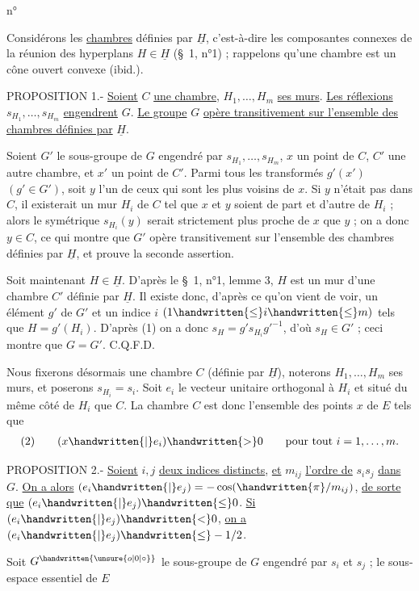 \begin{flushright}n°\end{flushright}
Considérons les \uline{chambres} définies par $\underline{H}$, c'est-à-dire les composantes connexes de la réunion des hyperplans $H\in\underline{H}$ (\S\ 1, n°1) ; rappelons qu'une chambre est un cône ouvert convexe (ibid.).

PROPOSITION 1.- \uline{Soient} $C$ \uline{une chambre}, $H_1,\ldots,H_m$ \uline{ses murs}. \uline{Les réflexions} $s_{H_1},\ldots,s_{H_m}$ \uline{engendrent} $G$. \uline{Le groupe} $G$ \uline{opère transitivement sur l'ensemble des chambres définies par} $\underline{H}$.

Soient $G'$ le sous-groupe de $G$ engendré par $s_{H_1},\ldots,s_{H_m}$, $x$ un point de $C$, $C'$ une autre chambre, et $x'$ un point de $C'$. Parmi tous les transformés $g'(x')$ $(g'\in G')$, soit $y$ l'un de ceux qui sont les plus voisins de $x$. Si $y$ n'était pas dans $C$, il existerait un mur $H_i$ de $C$ tel que $x$ et $y$ soient de part et d'autre de $H_i$ ; alors le symétrique $s_{H_i}(y)$ serait strictement plus proche de $x$ que $y$ ; on a donc $y\in C$, ce qui montre que $G'$ opère transitivement sur l'ensemble des chambres définies par $\underline{H}$, et prouve la seconde assertion.

Soit maintenant $H\in\underline{H}$. D'après le \S\ 1, n°1, lemme 3, $H$ est un mur d'une chambre $C'$ définie par $\underline{H}$. Il existe donc, d'après ce qu'on vient de voir, un élément $g'$ de $G'$ et un indice $i$ $(1\handwritten{\leq}i\handwritten{\leq}m)$ tels que $H=g'(H_i)$. D'après (1) on a donc $s_H=g's_{H_i}{g'}^{-1}$, d'où $s_H\in G'$ ; ceci montre que $G=G'$. C.Q.F.D.

Nous fixerons désormais une chambre $C$ (définie par $\underline{H}$), noterons $H_1,\ldots,H_m$ ses murs, et poserons $s_{H_i}=s_i$. Soit $e_i$ le vecteur unitaire orthogonal à $H_i$ et situé du même côté de $H_i$ que $C$. La chambre $C$ est donc l'ensemble des points $x$ de $E$ tels que
\[
\begin{array}{l@{\qquad}l}(2)&(x\handwritten{|}e_i)\handwritten{>}0\qquad\text{pour tout }i=1,\ldots,m.\end{array}
\]

PROPOSITION 2.- \uline{Soient} $i,j$ \uline{deux indices distincts}, \uline{et} $m_{ij}$ \uline{l'ordre de} $s_i s_j$ \uline{dans} $G$. \uline{On a alors} $(e_i\handwritten{|}e_j)=-\cos(\handwritten{\pi}/m_{ij})$, \uline{de sorte que} $(e_i\handwritten{|}e_j)\handwritten{\leq}0$. \uline{Si} $(e_i\handwritten{|}e_j)\handwritten{<}0$, \uline{on a} $(e_i\handwritten{|}e_j)\handwritten{\leq}-1/2$.

Soit $G^{\handwritten{\unsure{o|0|\circ}}}$ le sous-groupe de $G$ engendré par $s_i$ et $s_j$ ; le sous-espace essentiel de $E$
